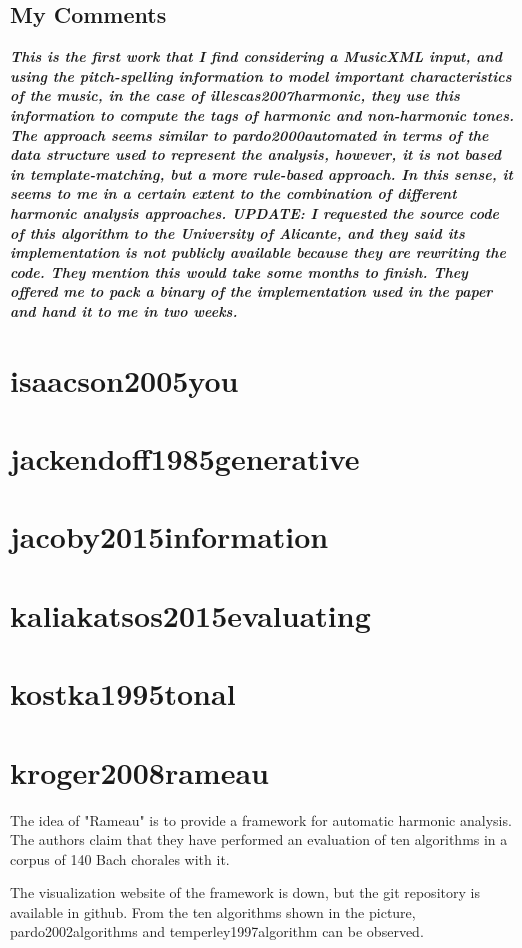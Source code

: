   \subsection{My Comments}
    \emph{\textbf{
      This is the first work that I find considering a MusicXML input, and using the pitch-spelling information to model important characteristics of the music, in the case of illescas2007harmonic, they use this information to compute the tags of harmonic and non-harmonic tones. The approach seems similar to pardo2000automated in terms of the data structure used to represent the analysis, however, it is not based in template-matching, but a more rule-based approach. In this sense, it seems to me in a certain extent to the combination of different harmonic analysis approaches. UPDATE: I requested the source code of this algorithm to the University of Alicante, and they said its implementation is not publicly available because they are rewriting the code. They mention this would take some months to finish. They offered me to pack a binary of the implementation used in the paper and hand it to me in two weeks.
    }}


\section{isaacson2005you }
\section{jackendoff1985generative }
\section{jacoby2015information }
\section{kaliakatsos2015evaluating }
\section{kostka1995tonal }
\section{kroger2008rameau }
  The idea of "Rameau" is to provide a framework for automatic harmonic analysis. The authors claim that they have performed an evaluation of ten algorithms in a corpus of 140 Bach chorales with it.

  The visualization website of the framework is down, but the git repository is available in github. From the ten algorithms shown in the picture, pardo2002algorithms and temperley1997algorithm can be observed.

